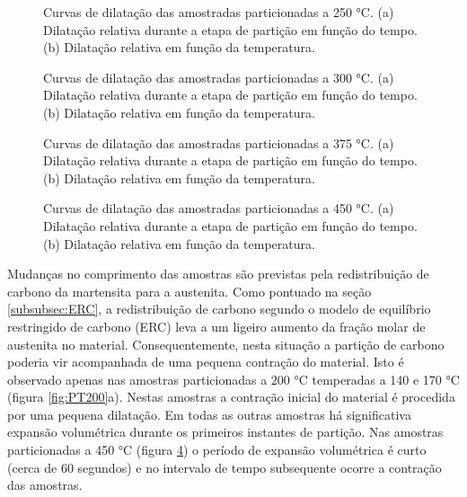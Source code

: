 \begin{figure}
	\quad
	\caption{Curvas de dilatação das amostradas particionadas a 250 °C. (a) Dilatação relativa durante a etapa de partição em função do tempo. (b) Dilatação relativa em função da temperatura.}
	\label{fig:PT250}
\end{figure}

\begin{figure}
	\quad
	\caption{Curvas de dilatação das amostradas particionadas a 300 °C. (a) Dilatação relativa durante a etapa de partição em função do tempo. (b) Dilatação relativa em função da temperatura.}
	\label{fig:PT300}
\end{figure}

\begin{figure}
	\quad
	\caption{Curvas de dilatação das amostradas particionadas a 375 °C. (a) Dilatação relativa durante a etapa de partição em função do tempo. (b) Dilatação relativa em função da temperatura.}
	\label{fig:PT375}
\end{figure}

\begin{figure}
	\quad
	\caption{Curvas de dilatação das amostradas particionadas a 450 °C. (a) Dilatação relativa durante a etapa de partição em função do tempo. (b) Dilatação relativa em função da temperatura.}
	\label{fig:PT450}
\end{figure}

Mudanças no comprimento das amostras são previstas pela redistribuição de carbono da martensita para a austenita. Como pontuado na seção \ref{subsubsec:ERC}, a redistribuição de carbono segundo o modelo de equilíbrio restringido de carbono (ERC) leva a um ligeiro aumento da fração molar de austenita no material. Consequentemente, nesta situação a partição de carbono poderia vir acompanhada de uma pequena contração do material. Isto é observado apenas nas amostras particionadas a 200 °C temperadas a 140 e 170 °C (figura \ref{fig:PT200}a). Nestas amostras a contração inicial do material é procedida por uma pequena dilatação. Em todas as outras amostras há significativa expansão volumétrica durante os primeiros instantes de partição. Nas amostras particionadas a 450 °C (figura \ref{fig:PT450}) o período de expansão volumétrica é curto (cerca de 60 segundos) e no intervalo de tempo subsequente ocorre a contração das amostras.

